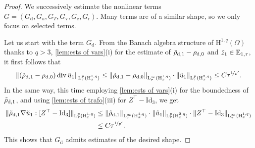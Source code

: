 \documentclass[10pt]{amsart}
\theoremstyle{plain}
\theoremstyle{definition}
\theoremstyle{thm}
\numberwithin{equation}{section}
\newcommand{\rL}{\mathrm{L}}
\newcommand{\rH}{\mathrm{H}}
\newcommand{\E}{\mathbb{E}}
\DeclareMathOperator{\mdiv}{div}
\newcommand{\rd}{\mathrm{d}}
\newcommand{\rr}{\mathrm{r}}
\newcommand{\rv}{\mathrm{v}}
\newcommand{\rc}{\mathrm{c}}
\newcommand{\trho}{\Tilde{\rho}}
\newcommand{\tu}{\Tilde{u}}
\newcommand{\tz}{\Tilde{z}}
\begin{document}
\begin{proof}
We successively estimate the nonlinear terms $G = (G_\rd,G_{u},G_T,G_\rv,G_\rc,G_\rr)$.
Many terms are of a similar shape, so we only focus on selected terms.

Let us start with the term $G_\rd$.
From the Banach algebra structure of $\rH^{1,q}(\Omega)$ thanks to $q > 3$, \autoref{lem:ests of vars}(i) for the estimate of $\trho_{\rd,1}-\rho_{\rd,0}$ and $\tz_1 \in \E_{1,\tau}$, it first follows that
\begin{equation*}
    \| (\trho_{\rd,1}-\rho_{\rd,0})\mdiv\tu_1 \|_{\rL_\tau^p(\rH_x^{1,q})} \le \| \trho_{\rd,1}-\rho_{\rd,0} \|_{\rL_\tau^\infty(\rH_x^{1,q})} \cdot \| \tu_1 \|_{\rL_\tau^p(\rH_x^{2,q})} \le C \tau^{\nicefrac{1}{p'}}.
\end{equation*}
In the same way, this time employing \autoref{lem:ests of vars}(i) for the boundedness of $\trho_{\rd,1}$, and using \autoref{lem:ests of trafo}(iii) for $Z^\top-\mathrm{Id}_3$, we get
\begin{equation*}
    \begin{aligned}
        \| \trho_{\rd,1}\nabla\tu_1:[Z^\top-\mathrm{Id}_3] \|_{\rL_\tau^p(\rH_x^{1,q})} 
        &\le \| \trho_{\rd,1} \|_{\rL_\tau^\infty(\rH_x^{1,q})} \cdot \| \tu_1 \|_{\rL_\tau^p(\rH_x^{2,q})} \cdot \| Z^\top - \mathrm{Id}_3 \|_{\rL_\tau^\infty(\rH_x^{1,q})}\\
        &\le C \tau^{\nicefrac{1}{p'}}.
    \end{aligned}
\end{equation*}
This shows that $G_\rd$ admits estimates of the desired shape.


\end{proof}
\end{document}
